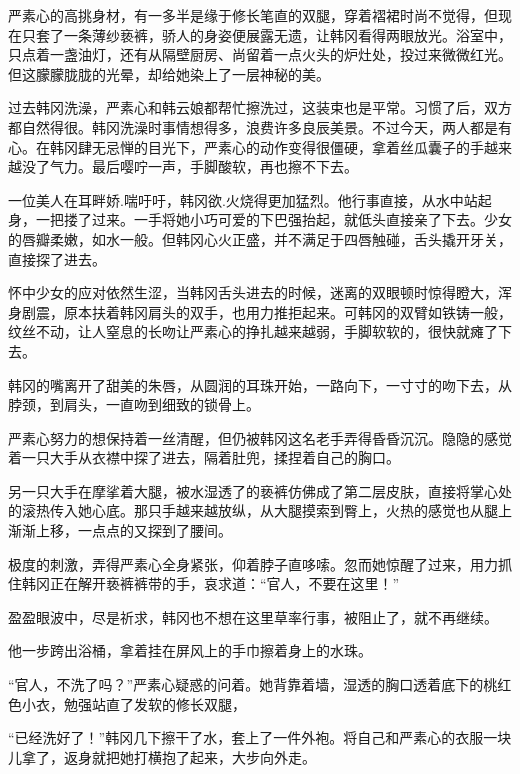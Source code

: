 严素心的高挑身材，有一多半是缘于修长笔直的双腿，穿着褶裙时尚不觉得，但现在只套了一条薄纱亵裤，骄人的身姿便展露无遗，让韩冈看得两眼放光。浴室中，只点着一盏油灯，还有从隔壁厨房、尚留着一点火头的炉灶处，投过来微微红光。但这朦朦胧胧的光晕，却给她染上了一层神秘的美。

过去韩冈洗澡，严素心和韩云娘都帮忙擦洗过，这装束也是平常。习惯了后，双方都自然得很。韩冈洗澡时事情想得多，浪费许多良辰美景。不过今天，两人都是有心。在韩冈肆无忌惮的目光下，严素心的动作变得很僵硬，拿着丝瓜囊子的手越来越没了气力。最后嘤咛一声，手脚酸软，再也擦不下去。

一位美人在耳畔娇.喘吁吁，韩冈欲.火烧得更加猛烈。他行事直接，从水中站起身，一把搂了过来。一手将她小巧可爱的下巴强抬起，就低头直接亲了下去。少女的唇瓣柔嫩，如水一般。但韩冈心火正盛，并不满足于四唇触碰，舌头撬开牙关，直接探了进去。

怀中少女的应对依然生涩，当韩冈舌头进去的时候，迷离的双眼顿时惊得瞪大，浑身剧震，原本扶着韩冈肩头的双手，也用力推拒起来。可韩冈的双臂如铁铸一般，纹丝不动，让人窒息的长吻让严素心的挣扎越来越弱，手脚软软的，很快就瘫了下去。

韩冈的嘴离开了甜美的朱唇，从圆润的耳珠开始，一路向下，一寸寸的吻下去，从脖颈，到肩头，一直吻到细致的锁骨上。

严素心努力的想保持着一丝清醒，但仍被韩冈这名老手弄得昏昏沉沉。隐隐的感觉着一只大手从衣襟中探了进去，隔着肚兜，揉捏着自己的胸口。

另一只大手在摩挲着大腿，被水湿透了的亵裤仿佛成了第二层皮肤，直接将掌心处的滚热传入她心底。那只手越来越放纵，从大腿摸索到臀上，火热的感觉也从腿上渐渐上移，一点点的又探到了腰间。

极度的刺激，弄得严素心全身紧张，仰着脖子直哆嗦。忽而她惊醒了过来，用力抓住韩冈正在解开亵裤裤带的手，哀求道：“官人，不要在这里！”

盈盈眼波中，尽是祈求，韩冈也不想在这里草率行事，被阻止了，就不再继续。

他一步跨出浴桶，拿着挂在屏风上的手巾擦着身上的水珠。

“官人，不洗了吗？”严素心疑惑的问着。她背靠着墙，湿透的胸口透着底下的桃红色小衣，勉强站直了发软的修长双腿，

“已经洗好了！”韩冈几下擦干了水，套上了一件外袍。将自己和严素心的衣服一块儿拿了，返身就把她打横抱了起来，大步向外走。

